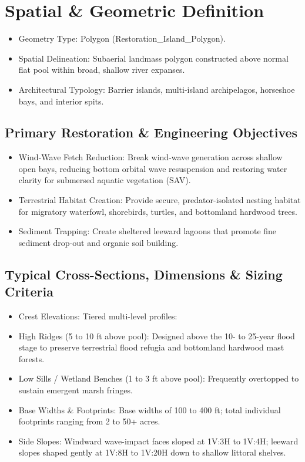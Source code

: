 \documentclass[
  letterpaper,
  DIV=11,
  numbers=noendperiod]{scrreprt}
\begin{document}
\section{Spatial \& Geometric
Definition}\label{spatial-geometric-definition-7}

\begin{itemize}
\item
  Geometry Type: Polygon (Restoration\_Island\_Polygon).
\item
  Spatial Delineation: Subaerial landmass polygon constructed above
  normal flat pool within broad, shallow river expanses.
\item
  Architectural Typology: Barrier islands, multi-island archipelagos,
  horseshoe bays, and interior spits.
\end{itemize}

\subsection{Primary Restoration \& Engineering
Objectives}\label{primary-restoration-engineering-objectives-6}

\begin{itemize}
\item
  Wind-Wave Fetch Reduction: Break wind-wave generation across shallow
  open bays, reducing bottom orbital wave resuspension and restoring
  water clarity for submersed aquatic vegetation (SAV).
\item
  Terrestrial Habitat Creation: Provide secure, predator-isolated
  nesting habitat for migratory waterfowl, shorebirds, turtles, and
  bottomland hardwood trees.
\item
  Sediment Trapping: Create sheltered leeward lagoons that promote fine
  sediment drop-out and organic soil building.
\end{itemize}

\subsection{Typical Cross-Sections, Dimensions \& Sizing
Criteria}\label{typical-cross-sections-dimensions-sizing-criteria-5}

\begin{itemize}
\item
  Crest Elevations: Tiered multi-level profiles:
\item
  High Ridges (5 to 10 ft above pool): Designed above the 10- to 25-year
  flood stage to preserve terrestrial flood refugia and bottomland
  hardwood mast forests.
\item
  Low Sills / Wetland Benches (1 to 3 ft above pool): Frequently
  overtopped to sustain emergent marsh fringes.
\item
  Base Widths \& Footprints: Base widths of 100 to 400 ft; total
  individual footprints ranging from 2 to 50+ acres.
\item
  Side Slopes: Windward wave-impact faces sloped at 1V:3H to 1V:4H;
  leeward slopes shaped gently at 1V:8H to 1V:20H down to shallow
  littoral shelves.
\end{itemize}
\end{document}

